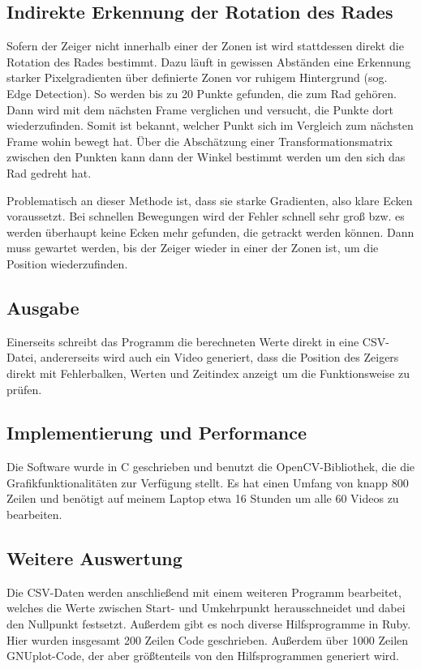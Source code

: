 \documentclass[a4paper,german,12pt,smallheadings]{scrartcl}
\begin{document}
\subsection{Indirekte Erkennung der Rotation des Rades}
Sofern der Zeiger nicht innerhalb einer der Zonen ist wird stattdessen direkt
die Rotation des Rades bestimmt. Dazu läuft in gewissen Abständen eine
Erkennung starker Pixelgradienten über definierte Zonen vor ruhigem Hintergrund
(sog. Edge Detection). So werden bis zu 20 Punkte gefunden, die zum Rad
gehören. Dann wird mit dem nächsten Frame verglichen und versucht, die Punkte
dort wiederzufinden. Somit ist bekannt, welcher Punkt sich im Vergleich zum
nächsten Frame wohin bewegt hat. Über die Abschätzung einer
Transformationsmatrix zwischen den Punkten kann dann der Winkel bestimmt werden
um den sich das Rad gedreht hat.

Problematisch an dieser Methode ist, dass sie starke Gradienten, also klare
Ecken voraussetzt. Bei schnellen Bewegungen wird der Fehler schnell sehr groß
bzw. es werden überhaupt keine Ecken mehr gefunden, die getrackt werden können.
Dann muss gewartet werden, bis der Zeiger wieder in einer der Zonen ist, um die
Position wiederzufinden.

\subsection{Ausgabe}
Einerseits schreibt das Programm die berechneten Werte direkt in eine CSV-Datei, andererseits wird auch ein Video generiert, dass die Position des Zeigers direkt mit Fehlerbalken, Werten und Zeitindex anzeigt um die Funktionsweise zu prüfen.

\subsection{Implementierung und Performance}
Die Software wurde in C geschrieben und benutzt die OpenCV-Bibliothek, die die
Grafikfunktionalitäten zur Verfügung stellt. Es hat einen Umfang von knapp 800
Zeilen und benötigt auf meinem Laptop etwa 16 Stunden um alle 60 Videos zu
bearbeiten.

\subsection{Weitere Auswertung}
Die CSV-Daten werden anschließend mit einem weiteren Programm bearbeitet,
welches die Werte zwischen Start- und Umkehrpunkt herausschneidet und dabei den
Nullpunkt festsetzt. Außerdem gibt es noch diverse Hilfsprogramme in Ruby. Hier
wurden insgesamt 200 Zeilen Code geschrieben. Außerdem über 1000 Zeilen
GNUplot-Code, der aber größtenteils von den Hilfsprogrammen generiert wird.
\end{document}
